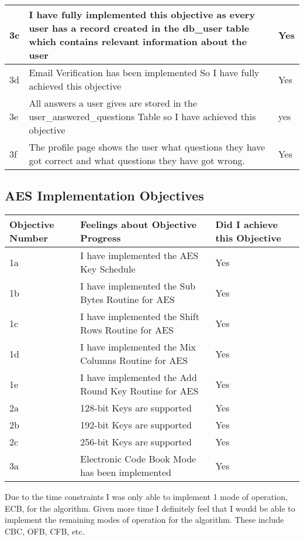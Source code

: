 \begin{longtable}{|p{}|p{}|p{}|}
\midrule
3c & I have fully implemented this objective as every user has a record created in the db\_user table which contains relevant information about the user & Yes\\
\midrule
3d & Email Verification has been implemented So I have fully achieved this objective & Yes\\
\midrule
3e & All answers a user gives are stored in the user\_answered\_questions Table so I have achieved this objective & yes\\
\midrule
3f & The profile page shows the user what questions they have got correct and what questions they have got wrong. & Yes\\
\bottomrule
\end{longtable}

\subsection{AES Implementation Objectives}


\begin{longtable}{|p{}|p{}|p{}|}
\toprule 
Objective Number & Feelings about Objective Progress & Did I achieve this Objective  \\
\midrule
1a & I have implemented the AES Key Schedule  & Yes \\
\midrule
1b & I have implemented the Sub Bytes Routine for AES & Yes \\
\midrule
1c & I have implemented the Shift Rows Routine for AES & Yes \\
\midrule
1d & I have implemented the Mix Columns Routine for AES & Yes \\
\midrule
1e & I have implemented the Add Round Key Routine for AES & Yes \\
\midrule
2a & 128-bit Keys are supported & Yes \\
\midrule 
2b & 192-bit Keys are supported & Yes \\
\midrule 
2c & 256-bit Keys are supported & Yes \\
\midrule 
3a & Electronic Code Book Mode has been implemented & Yes \\
\bottomrule
\end{longtable}

Due to the time constraints I was only able to implement 1 mode of operation, ECB, for the algorithm. Given more time I definitely feel that I would be able to implement the remaining modes of operation for the algorithm. These include CBC, OFB, CFB, etc.


